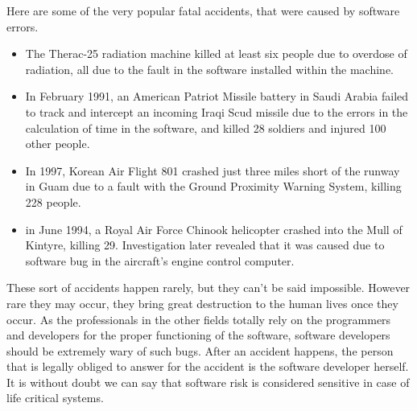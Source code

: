 \documentclass [12pt, a4paper]{article}
\begin{document}
Here are some of the very popular fatal accidents, that were caused by software errors.\\
\begin{itemize}
	\item The Therac-25 radiation machine killed at least six people due to overdose of radiation, all due to the fault in the software installed within the machine.
	\item In February 1991, an American Patriot Missile battery in Saudi Arabia failed to track and intercept an incoming Iraqi Scud missile due to the errors in the calculation of time in the software, and killed 28 soldiers and injured 100 other people.
	\item In 1997, Korean Air Flight 801 crashed just three miles short of the runway in Guam due to a fault with the Ground Proximity Warning System, killing 228 people.
	\item in June 1994, a Royal Air Force Chinook helicopter crashed into the Mull of Kintyre, killing 29. Investigation later revealed that it was caused due to software bug in the aircraft's engine control computer.
\end{itemize}

These sort of accidents happen rarely, but they can't be said impossible. However rare they may occur, they bring great destruction to the human lives once they occur. As the professionals in the other fields totally rely on the programmers and developers for the proper functioning of the software, software developers should be extremely wary of such bugs. After an accident happens, the person that is legally obliged to answer for the accident is the software developer herself. It is without doubt we can say that software risk is considered sensitive in case of life critical systems.\\
\end{document}
